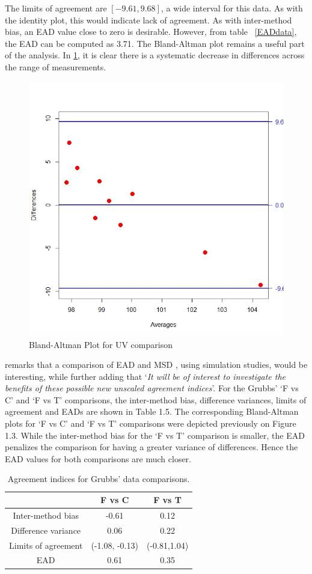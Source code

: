 \documentclass[12pt, a4paper]{report}
\theoremstyle{plain}
\theoremstyle{definition}
\theoremstyle{remark}
\begin{document}
The limits of agreement are $[-9.61, 9.68]$, a wide interval for this data. As with the identity plot, this would indicate lack of agreement. As with inter-method bias, an EAD value close to zero is desirable. However, from table ~\ref{EADdata}, the EAD can be computed as 3.71. The Bland-Altman plot remains a useful part of the analysis. In \ref{fig:EAD1}, it is clear there is a systematic decrease in differences across the range of measurements.
\begin{figure}
	\centering
	\includegraphics[width=0.5\linewidth]{images/EAD1}
	\caption{Bland-Altman Plot for UV comparison}
	\label{fig:EAD1}
\end{figure}

\citet{Barnhart} remarks that a comparison of EAD and MSD , using
simulation studies, would be interesting, while further adding
that `\textit{It will be of interest to investigate the benefits of these
	possible new unscaled agreement indices}'. For the Grubbs' `F vs C' and `F vs T' comparisons, the inter-method bias, difference variances, limits of agreement and EADs are shown
in Table 1.5. The corresponding Bland-Altman plots for `F vs C' and `F vs T' comparisons were depicted previously on Figure 1.3. While the inter-method bias for the `F vs T' comparison is smaller, the EAD penalizes the comparison for having a greater variance of differences. Hence the EAD values for both comparisons are much closer.
\begin{table}[ht]
	\begin{center}
		\begin{tabular}{|c||c|c|}
			\hline
			& F vs C & F vs T  \\\hline
			\hline
			Inter-method bias & -0.61 & 0.12 \\ \hline
			Difference variance & 0.06 & 0.22  \\ \hline 
			Limits of agreement & (-1.08,	-0.13) & (-0.81,1.04) \\ \hline
			EAD & 0.61 & 0.35  \\ \hline 
			
		\end{tabular}
		\caption{Agreement indices for Grubbs' data comparisons.}
	\end{center}
\end{table}
\end{document}
